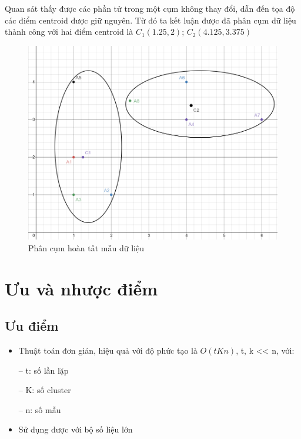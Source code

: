 \documentclass{article}
\begin{document}
	Quan sát thấy được các phần tử trong một cụm không thay đổi, dẫn đến tọa độ các điểm centroid được giữ nguyên. Từ đó ta kết luận được đã phân cụm dữ liệu thành công với hai điểm centroid là $C_1(1.25,2)$; $C_2(4.125,3.375)$\par
	\begin{figure}[h]
		\centering
		\includegraphics[width=0.6\linewidth]{img/ex_3}
		\caption{Phân cụm hoàn tất mẫu dữ liệu}
	\end{figure}\par
	\newpage
	\section{Ưu và nhược điểm} %
	\subsection{Ưu điểm}
	\begin{itemize}
		\item Thuật toán đơn giản, hiệu quả với độ phức tạo là $O(tKn)$, t, k << n, với:
		\item[--]t: số lần lặp
		\item[--]K: số cluster
		\item[--]n: số mẫu
		\item Sử dụng được với bộ số liệu lớn
	\end{itemize}
\end{document}
